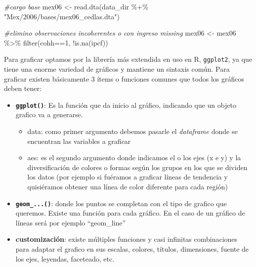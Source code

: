 \documentclass[
]{book}
\newenvironment{Shaded}{\begin{snugshade}}{\end{snugshade}}
\newcommand{\CommentTok}[1]{\textcolor[rgb]{0.56,0.35,0.01}{\textit{#1}}}
\newcommand{\DecValTok}[1]{\textcolor[rgb]{0.00,0.00,0.81}{#1}}
\newcommand{\FunctionTok}[1]{\textcolor[rgb]{0.00,0.00,0.00}{#1}}
\newcommand{\NormalTok}[1]{#1}
\newcommand{\OtherTok}[1]{\textcolor[rgb]{0.56,0.35,0.01}{#1}}
\newcommand{\SpecialCharTok}[1]{\textcolor[rgb]{0.00,0.00,0.00}{#1}}
\newcommand{\StringTok}[1]{\textcolor[rgb]{0.31,0.60,0.02}{#1}}
\providecommand{\tightlist}{%
  \setlength{\itemsep}{0pt}\setlength{\parskip}{0pt}}
\begin{document}
\begin{Shaded}
\begin{Highlighting}[]
\CommentTok{\#cargo base}
\NormalTok{mex06 }\OtherTok{\textless{}{-}} \FunctionTok{read.dta}\NormalTok{(data\_dir }\SpecialCharTok{\%+\%} \StringTok{"Mex/2006/bases/mex06\_cedlas.dta"}\NormalTok{)  }

\CommentTok{\#elimino observaciones incoherentes o con ingreso missing}
\NormalTok{mex06 }\OtherTok{\textless{}{-}}\NormalTok{ mex06 }\SpecialCharTok{\%\textgreater{}\%} \FunctionTok{filter}\NormalTok{(cohh}\SpecialCharTok{==}\DecValTok{1}\NormalTok{, }\SpecialCharTok{!}\FunctionTok{is.na}\NormalTok{(ipcf)) }
\end{Highlighting}
\end{Shaded}

Para graficar optamos por la librería más extendida en uso en R, \texttt{ggplot2}, ya que tiene una enorme variedad de gráficos y mantiene un sintaxis común. Para graficar existen básicamente 3 ítems o funciones comunes que todos los gráficos deben tener:

\begin{itemize}
\tightlist
\item
  \textbf{\texttt{ggplot()}}: Es la función que da inicio al gráfico, indicando que un objeto grafico va a generarse.

  \begin{itemize}
  \tightlist
  \item
    data: como primer argumento debemos pasarle el \emph{dataframe} donde se encuentran las variables a graficar
  \item
    aes: es el segundo argumento donde indicamos el o los ejes (x e y) y la diversificación de colores o formas según los grupos en los que se dividen los datos (por ejemplo si fuéramos a graficar líneas de tendencia y quisiéramos obtener una línea de color diferente para cada región)
  \end{itemize}
\item
  \textbf{\texttt{geom\_...()}}: donde los puntos se completan con el tipo de grafico que queremos. Existe una función para cada gráfico. En el caso de un gráfico de líneas será por ejemplo ``geom\_line''
\item
  \textbf{customización}: existe múltiples funciones y casi infinitas combinaciones para adaptar el grafico en sus escalas, colores, títulos, dimensiones, fuente de los ejes, leyendas, faceteado, etc.
\end{itemize}
\end{document}
